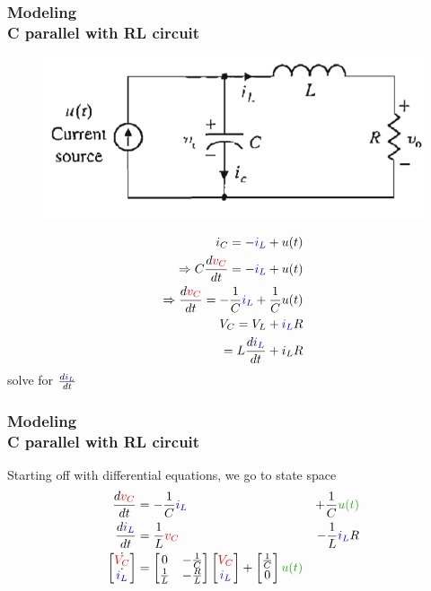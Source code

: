 \documentclass[hyperref={pdfpagelabels=true}]{beamer}
\begin{document}
\begin{frame}
\frametitle{Modeling\\ {\large C parallel with RL circuit}} 
\begin{figure}[!t]
\centering
\includegraphics[scale = 0.25]{figs/Selection_021.png}
\end{figure}
\begin{eqnarray*}
i_C=-\textcolor{blue}{i_L}+u(t) \\
\Rightarrow C\frac{d\textcolor{red}{v_C}}{dt}=-\textcolor{blue}{i_L}+u(t) \\
\Rightarrow \frac{d\textcolor{red}{v_C}}{dt}=-\frac{1}{C}\textcolor{blue}{i_L}+\frac{1}{C}u(t)
\\  \newline \newline
V_C=V_L+\textcolor{blue}{i_L}R 
\\ = L\frac{d\textcolor{blue}{i_L}}{dt}+i_LR
\end{eqnarray*}
solve for $\frac{d\textcolor{blue}{i_L}}{dt}$
\end{frame}

\begin{frame}
\frametitle{Modeling\\ {\large C parallel with RL circuit}} 
Starting off with differential equations, we go to state space
\begin{eqnarray*}
\frac{d\textcolor{red}{v_C}}{dt}&=-\frac{1}{C}\textcolor{blue}{i_L}&+\frac{1}{C}\textcolor{mygreen}{u(t)} \\
\frac{d\textcolor{blue}{i_L}}{dt}&=\frac{1}{L}\textcolor{red}{v_C}&-\frac{1}{L}\textcolor{blue}{i_L}R \\ 
\begin{bmatrix}
\dot{\textcolor{red}{V_C}} \\ 
\dot{\textcolor{blue}{i_L}}
\end{bmatrix} &= \begin{bmatrix} 
0 & -\frac{1}{C} \\ 
\frac{1}{L} & -\frac{R}{L}
\end{bmatrix}\begin{bmatrix}
\textcolor{red}{V_C} \\
\textcolor{blue}{i_L}
\end{bmatrix} + \begin{bmatrix}
\frac{1}{C} \\ 0
\end{bmatrix}\textcolor{mygreen}{u(t)}
\end{eqnarray*}
\end{frame}
\end{document}
